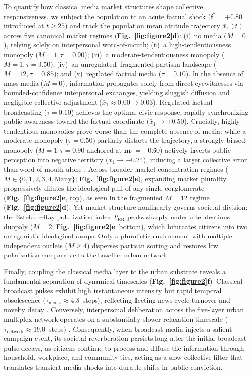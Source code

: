 \documentclass{article}
\begin{document}
To quantify how classical media market structures shape collective responsiveness, we subject the population to an acute factual shock ($\mathbf{f}^* = +0.80$ introduced at $t \ge 25$) and track the population mean attitude trajectory $\bar{x}_1(t)$ across five canonical market regimes (\textbf{Fig.~\ref{fig:figure2}d}): (i)~no media ($M=0$), relying solely on interpersonal word-of-mouth; (ii)~a high-tendentiousness monopoly ($M=1, \tau=0.90$); (iii)~a moderate-tendentiousness monopoly ($M=1, \tau=0.50$); (iv)~an unregulated, fragmented partisan landscape ($M=12, \tau=0.85$); and (v)~regulated factual media ($\tau=0.10$). In the absence of mass media ($M=0$), information propagates solely from direct eyewitnesses via bounded-confidence interpersonal exchanges, yielding sluggish diffusion and negligible collective adjustment ($\bar{x}_1 \approx 0.00 \to 0.03$). Regulated factual broadcasting ($\tau = 0.10$) achieves the optimal civic response, rapidly synchronizing public awareness toward the factual coordinate ($\bar{x}_1 \to +0.50$). Crucially, highly tendentious monopolies prove worse than the complete absence of media: while a moderate monopoly ($\tau = 0.50$) partially distorts the trajectory, a strongly biased monopoly ($M=1, \tau = 0.90$ anchored at $\mathbf{m}_1 = -0.60$) actively inverts public perception into negative territory ($\bar{x}_1 \to -0.24$), inducing a larger collective error than word-of-mouth alone \citep{dellavigna2007fox}. Across broader market concentration regimes ($M \in \{0, 1, 2, 3, 4, \text{Many}\}$; \textbf{Fig.~\ref{fig:figure2}e}), expanding market plurality progressively dilutes the ideological pull of any single conglomerate (\textbf{Fig.~\ref{fig:figure2}e}, top), as seen in the fragmented $M=12$ regime (\textbf{Fig.~\ref{fig:figure2}d}). Yet market structure nonlinearly governs societal division: the Esteban--Ray polarization index $P_{\mathrm{ER}}$ \citep{esteban1994measurement} peaks sharply under a tendentious duopoly ($M=2$; \textbf{Fig.~\ref{fig:figure2}e}, bottom), which bifurcates citizens into two antagonistic ideological camps. Only a pluralistic environment with multiple independent outlets ($M \ge 4$) disperses partisan sorting and restores low polarization comparable to the baseline urban network.

Finally, coupling the classical media layer to the urban substrate reveals a fundamental separation of dynamical timescales (\textbf{Fig.~\ref{fig:figure2}f}). Classical broadcast pulses exhibit high instantaneous intensity but rapid temporal obsolescence ($\tau_{\mathrm{media}} \approx 4.8$~steps), reflecting fleeting news-cycle turnover and novelty decay \citep{downs1972up, wu2007novelty}. Conversely, interpersonal deliberation across the five-layer urban multiplex network operates on a substantially slower relaxation timescale ($\tau_{\mathrm{network}} \approx 19.0$~steps) \citep{granovetter1973strength, friedkin1990social}. Consequently, when broadcast media injects a salient campaign event, its societal reverberation persists long after the initial broadcast pulse decays, as citizens continue to process and diffuse the information through household, workplace, and community ties, acting as a slow collective filter that translates transient media shocks into durable shifts in public conviction.
\end{document}
